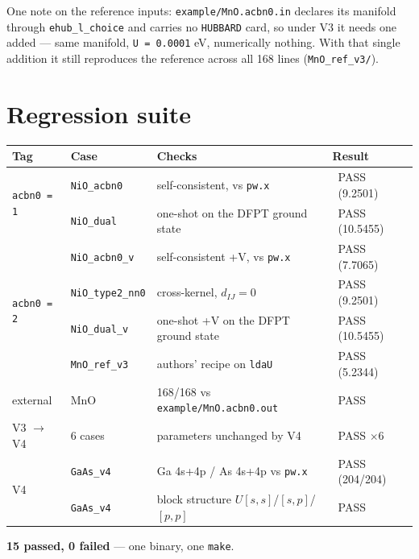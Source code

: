 \documentclass[11pt,a4paper]{article}
\newcommand{\C}[1]{\texttt{\small #1}}
\newcommand{\good}{\textcolor{accent}{\textbf{\checkmark}}}
\begin{document}
\smallskip
\noindent
One note on the reference inputs: \C{example/MnO.acbn0.in} declares its manifold
through \C{ehub_l_choice} and carries no \C{HUBBARD} card, so under V3 it needs
one added --- same manifold, \C{U = 0.0001} eV, numerically nothing. With that
single addition it still reproduces the reference across all 168 lines
(\C{MnO_ref_v3/}).

\section{Regression suite}

\begin{center}\small
\begin{tabular}{llll}
\toprule
Tag & Case & Checks & Result \\
\midrule
\multirow{2}{*}{\C{acbn0 = 1}}
 & \C{NiO_acbn0}     & self-consistent, vs \C{pw.x} & \good\ PASS \ (9.2501) \\
 & \C{NiO_dual}      & one-shot on the DFPT ground state & \good\ PASS \ (10.5455) \\
\midrule
\multirow{4}{*}{\C{acbn0 = 2}}
 & \C{NiO_acbn0_v}   & self-consistent +V, vs \C{pw.x} & \good\ PASS \ (7.7065) \\
 & \C{NiO_type2_nn0} & cross-kernel, $d_{IJ}=0$ & \good\ PASS \ (9.2501) \\
 & \C{NiO_dual_v}    & one-shot +V on the DFPT ground state & \good\ PASS \ (10.5455) \\
 & \C{MnO_ref_v3}    & authors' recipe on \C{ldaU} & \good\ PASS \ (5.2344) \\
\midrule
external & MnO & 168/168 vs \C{example/MnO.acbn0.out} & \good\ PASS \\
\midrule
V3 $\to$ V4 & 6 cases & parameters unchanged by V4 & \good\ PASS $\times 6$ \\
\midrule
\multirow{2}{*}{V4}
 & \C{GaAs_v4} & Ga 4s+4p / As 4s+4p vs \C{pw.x} & \good\ PASS \ (204/204) \\
 & \C{GaAs_v4} & block structure $U[s,s]$/$[s,p]$/$[p,p]$ & \good\ PASS \\
\bottomrule
\end{tabular}
\end{center}

\begin{center}
\textbf{\textcolor{accent}{15 passed, 0 failed}} \quad --- one binary, one \C{make}.
\end{center}
\end{document}
